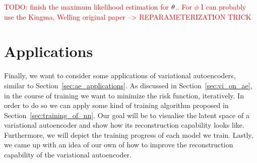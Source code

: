 \textcolor{red}{TODO: finish the maximum likelihood estimation for $\theta$.. For $\phi$ I can probably use the Kingma, Welling original paper --> REPARAMETERIZATION TRICK}


\section{Applications}\label{sec:vae_applications}

Finally, we want to consider some applications of variational autoencoders, similar to Section~\ref{sec:ae_applications}. As discussed in Section~\ref{sec:vi_on_ae}, in the course of training we want to minimize the risk function, iteratively. In order to do so we can apply some kind of training algorithm proposed in Section~\ref{sec:training_of_nn}. Our goal will be to visualise the latent space of a variational autoencoder and show how its reconstruction capability looks like. Furthermore, we will depict the training progress of each model we train. Lastly, we came up with an idea of our own of how to improve the reconstruction capability of the variational autoencoder.
